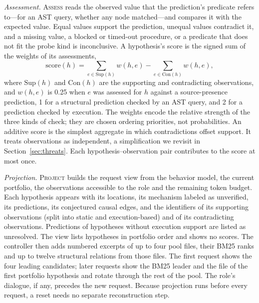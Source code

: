 \documentclass[a4paper,fleqn]{cas-sc}
\begin{document}
\emph{Assessment.} \textsc{Assess} reads the observed value that the prediction's predicate refers to---for an AST query, whether any node matched---and compares it with the expected value. Equal values support the prediction, unequal values contradict it, and a missing value, a blocked or timed-out procedure, or a predicate that does not fit the probe kind is inconclusive. A hypothesis's score is the signed sum of the weights of its assessments,
\begin{equation}\label{eq:score}
\mathrm{score}(h)=\sum_{e\in\mathrm{Sup}(h)} w(h,e)-\sum_{e\in\mathrm{Con}(h)} w(h,e),
\end{equation}
where $\mathrm{Sup}(h)$ and $\mathrm{Con}(h)$ are the supporting and contradicting observations, and $w(h,e)$ is 0.25 when $e$ was assessed for $h$ against a source-presence prediction, 1 for a structural prediction checked by an AST query, and 2 for a prediction checked by execution. The weights encode the relative strength of the three kinds of check; they are chosen ordering priorities, not probabilities. An additive score is the simplest aggregate in which contradictions offset support. It treats observations as independent, a simplification we revisit in Section~\ref{sec:threats}. Each hypothesis--observation pair contributes to the score at most once.

\emph{Projection.} \textsc{Project} builds the request view from the behavior model, the current portfolio, the observations accessible to the role and the remaining token budget. Each hypothesis appears with its locations, its mechanism labeled as unverified, its predictions, its conjectured causal edges, and the identifiers of its supporting observations (split into static and execution-based) and of its contradicting observations. Predictions of hypotheses without execution support are listed as unresolved. The view lists hypotheses in portfolio order and shows no scores. The controller then adds numbered excerpts of up to four pool files, their BM25 ranks and up to twelve structural relations from those files. The first request shows the four leading candidates; later requests show the BM25 leader and the file of the first portfolio hypothesis and rotate through the rest of the pool. The role's dialogue, if any, precedes the new request. Because projection runs before every request, a reset needs no separate reconstruction step.
\end{document}
